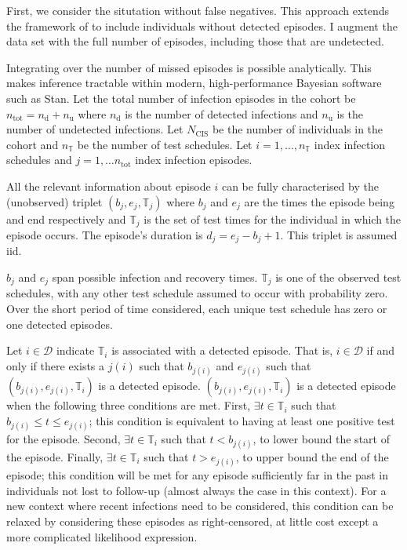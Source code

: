 \documentclass[12pt, letterpaper]{article} %
\newcommand\set{\mathcal}
\newcommand{\ntot}{n_\text{tot}}
\newcommand{\ndet}{n_\text{d}}
\newcommand{\nnodet}{n_\text{u}}
\newcommand{\Ncis}{N_\text{CIS}}
\newcommand{\sched}{\mathbb{T}}
\newcommand{\nsched}{n_{\sched}}
\begin{document}
First, we consider the situtation without false negatives.
This approach extends the framework of \textcite{heiseyModelling} to include individuals without detected episodes.
I augment the data set with the full number of episodes, including those that are undetected.

Integrating over the number of missed episodes is possible analytically.
This makes inference tractable within modern, high-performance Bayesian software such as Stan.
Let the total number of infection episodes in the cohort be $\ntot = \ndet + \nnodet$ where $\ndet$ is the number of detected infections and $\nnodet$ is the number of undetected infections.
Let $\Ncis$ be the number of individuals in the cohort and $\nsched$ be the number of test schedules.
Let $i = 1, \dots, \nsched$ index infection schedules and $j = 1, \dots \ntot$ index infection episodes.

All the relevant information about episode $i$ can be fully characterised by the (unobserved) triplet $(b_j, e_j, \sched_j)$ where $b_j$ and $e_j$ are the times the episode being and end respectively and $\sched_j$ is the set of test times for the individual in which the episode occurs.
The episode's duration is $d_j = e_j - b_j + 1$.
This triplet is assumed iid.

$b_j$ and $e_j$ span possible infection and recovery times.
$\sched_j$ is one of the observed test schedules, with any other test schedule assumed to occur with probability zero.
Over the short period of time considered, each unique test schedule has zero or one detected episodes.

Let $i \in \set{D}$ indicate $\sched_i$ is associated with a detected episode.
That is, $i \in \set{D}$ if and only if there exists a $j(i)$ such that $b_{j(i)}$ and $e_{j(i)}$ such that $(b_{j(i)}, e_{j(i)}, \sched_i)$ is a detected episode.
$(b_{j(i)}, e_{j(i)}, \sched_i)$ is a detected episode when the following three conditions are met.
First, $\exists t \in \sched_i$ such that $b_{j(i)} \leq t \leq e_{j(i)}$; this condition is equivalent to having at least one positive test for the episode.
Second, $\exists t \in \sched_i$ such that $t < b_{j(i)}$, to lower bound the start of the episode.
Finally, $\exists t \in \sched_i$ such that $t > e_{j(i)}$, to upper bound the end of the episode; this condition will be met for any episode sufficiently far in the past in individuals not lost to follow-up (almost always the case in this context).
For a new context where recent infections need to be considered, this condition can be relaxed by considering these episodes as right-censored, at little cost except a more complicated likelihood expression.
\end{document}
